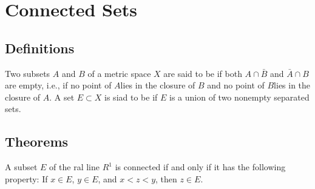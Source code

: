 \section{Connected Sets}
\subsection{Definitions}
\begin{deff}
	Two subsets $A$ and $B$ of a metric space $X$ are said to be {} if both $A \cap \bar B$ and $\bar A \cap B$ are empty, i.e., if no point of $A$lies in the closure of $B$ and no point of $B$lies in the closure of $A$. A set $E \subset X$ is siad to be {} if $E$ is {} a union of two nonempty separated sets. 
\end{deff}

\subsection{Theorems}
\begin{thm}
	A subset $E$ of the ral line $R^1$ is connected if and only if it has the following property: If $x \in E$, $y \in E$, and $x < z < y$, then $z \in E$.
\end{thm}